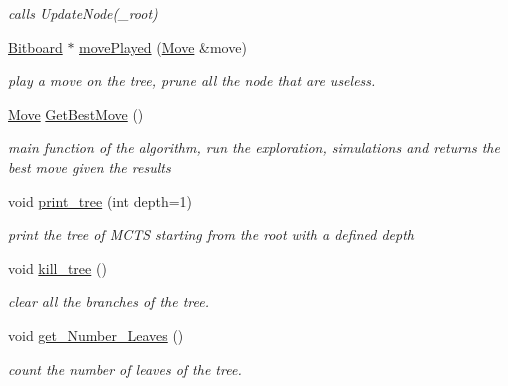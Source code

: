 \begin{DoxyCompactItemize}
\begin{DoxyCompactList}\small\item\em calls Update\+Node(\+\_\+root) \end{DoxyCompactList}\item 
\hyperlink{class_bitboard}{Bitboard} $\ast$ \hyperlink{classmcts_1_1_mcts_ac35bbdb3901e141afb1fa59fe27e09ef}{move\+Played} (\hyperlink{class_move}{Move} \&move)
\begin{DoxyCompactList}\small\item\em play a move on the tree, prune all the node that are useless. \end{DoxyCompactList}\item 
\hyperlink{class_move}{Move} \hyperlink{classmcts_1_1_mcts_a30f80b3581b1d967f2fdcc651e7773b8}{Get\+Best\+Move} ()
\begin{DoxyCompactList}\small\item\em main function of the algorithm, run the exploration, simulations and returns the best move given the results \end{DoxyCompactList}\item 
void \hyperlink{classmcts_1_1_mcts_a9ba60b877c5c772b3a2310a99f053ee8}{print\+\_\+tree} (int depth=1)
\begin{DoxyCompactList}\small\item\em print the tree of M\+C\+T\+S starting from the root with a defined depth \end{DoxyCompactList}\item 
\hypertarget{classmcts_1_1_mcts_a26c80c04a3b8f39314297592b31a8626}{void \hyperlink{classmcts_1_1_mcts_a26c80c04a3b8f39314297592b31a8626}{kill\+\_\+tree} ()}\label{classmcts_1_1_mcts_a26c80c04a3b8f39314297592b31a8626}

\begin{DoxyCompactList}\small\item\em clear all the branches of the tree. \end{DoxyCompactList}\item 
\hypertarget{classmcts_1_1_mcts_a91912516619bdc9c5cd6709a3bf61f83}{void \hyperlink{classmcts_1_1_mcts_a91912516619bdc9c5cd6709a3bf61f83}{get\+\_\+\+Number\+\_\+\+Leaves} ()}\label{classmcts_1_1_mcts_a91912516619bdc9c5cd6709a3bf61f83}

\begin{DoxyCompactList}\small\item\em count the number of leaves of the tree. \end{DoxyCompactList}\end{DoxyCompactItemize}


